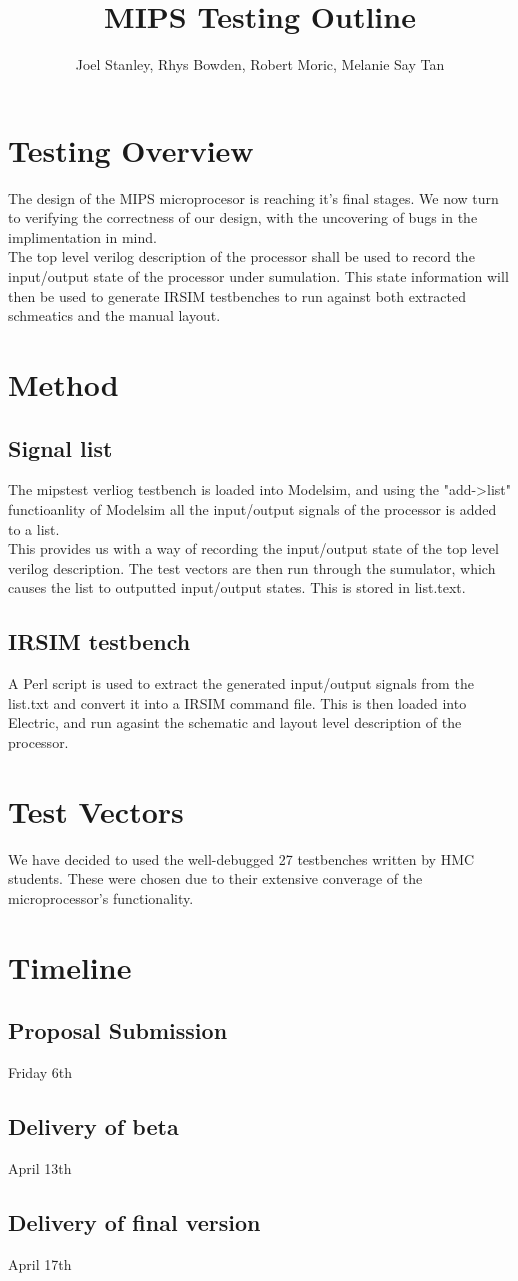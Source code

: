 \documentclass[a4paper,12pt]{article}
\begin{document}
\author{Joel Stanley, Rhys Bowden, Robert Moric, Melanie Say Tan}
\title{MIPS Testing Outline}
\maketitle

\section{Testing Overview}
The design of the MIPS microprocesor is reaching it's final stages. We now turn to verifying the correctness of our design, with the uncovering of bugs in the implimentation in mind.
\\The top level verilog description of the processor shall be used to record the input/output state of the processor under sumulation. This state information will then be used to generate IRSIM testbenches to run against both extracted schmeatics and the manual layout.

\section{Method}
\subsection{Signal list}
The mipstest verliog testbench is loaded into Modelsim, and using the
"add->list" functioanlity of Modelsim all the input/output signals of
the processor is added to a list.
\\This provides us with a way of
recording the input/output state of the top level verilog description.
The test vectors are then run through the sumulator, which causes the
list to outputted input/output states. This is stored in list.text.

\subsection{IRSIM testbench}
A Perl script is used to extract the generated input/output signals
from the list.txt and convert it into a IRSIM command file. This is
then loaded into Electric, and run agasint the schematic and layout
level description of the processor.

\section{Test Vectors}
We have decided to used the well-debugged 27 testbenches written by HMC
students. These were chosen due to their extensive converage of the
microprocessor's functionality.

\section{Timeline}
\subsection{Proposal Submission}
Friday 6th

\subsection{Delivery of beta}
April 13th

\subsection{Delivery of final version}
April 17th
\end{document}
